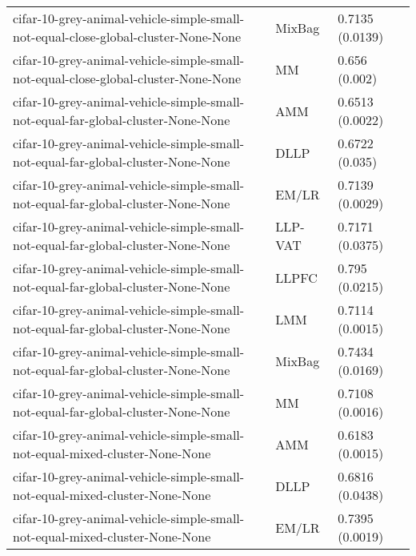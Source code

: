 \begin{longtable}{lll}
                           cifar-10-grey-animal-vehicle-simple-small-not-equal-close-global-cluster-None-None &    MixBag &                           0.7135 (0.0139) \\
                           cifar-10-grey-animal-vehicle-simple-small-not-equal-close-global-cluster-None-None &        MM &                             0.656 (0.002) \\
                             cifar-10-grey-animal-vehicle-simple-small-not-equal-far-global-cluster-None-None &       AMM &                           0.6513 (0.0022) \\
                             cifar-10-grey-animal-vehicle-simple-small-not-equal-far-global-cluster-None-None &      DLLP &                            0.6722 (0.035) \\
                             cifar-10-grey-animal-vehicle-simple-small-not-equal-far-global-cluster-None-None &     EM/LR &                           0.7139 (0.0029) \\
                             cifar-10-grey-animal-vehicle-simple-small-not-equal-far-global-cluster-None-None &   LLP-VAT &                           0.7171 (0.0375) \\
                             cifar-10-grey-animal-vehicle-simple-small-not-equal-far-global-cluster-None-None &     LLPFC &                            0.795 (0.0215) \\
                             cifar-10-grey-animal-vehicle-simple-small-not-equal-far-global-cluster-None-None &       LMM &                           0.7114 (0.0015) \\
                             cifar-10-grey-animal-vehicle-simple-small-not-equal-far-global-cluster-None-None &    MixBag &                           0.7434 (0.0169) \\
                             cifar-10-grey-animal-vehicle-simple-small-not-equal-far-global-cluster-None-None &        MM &                           0.7108 (0.0016) \\
                                  cifar-10-grey-animal-vehicle-simple-small-not-equal-mixed-cluster-None-None &       AMM &                           0.6183 (0.0015) \\
                                  cifar-10-grey-animal-vehicle-simple-small-not-equal-mixed-cluster-None-None &      DLLP &                           0.6816 (0.0438) \\
                                  cifar-10-grey-animal-vehicle-simple-small-not-equal-mixed-cluster-None-None &     EM/LR &                           0.7395 (0.0019) \\

\end{longtable}
